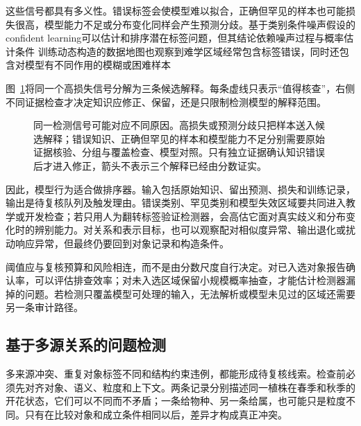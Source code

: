 \Needspace{95mm}
这些信号都具有多义性。错误标签会使模型难以拟合，正确但罕见的样本也可能损失很高，模型能力不足或分布变化同样会产生预测分歧。基于类别条件噪声假设的confident learning可以估计和排序潜在标签问题，但其结论依赖噪声过程与概率估计条件 训练动态构造的数据地图也观察到难学区域经常包含标签错误，同时还包含对模型有不同作用的模糊或困难样本

图~\ref{fig:knowledge-quality-assessment-correction-detection-signal}将同一个高损失信号分解为三条候选解释。每条虚线只表示“值得核查”，右侧不同证据检查才决定知识应修正、保留，还是只限制检测模型的解释范围。

\begin{figure}[p]
  \centering
  
  \caption{同一检测信号可能对应不同原因。高损失或预测分歧只把样本送入候选解释；错误知识、正确但罕见的样本和模型能力不足分别需要原始证据核验、分组与覆盖检查、模型对照。只有独立证据确认知识错误后才进入修正，箭头不表示三个解释已经由分数证实。}
  \label{fig:knowledge-quality-assessment-correction-detection-signal}
\end{figure}
\FloatBarrier

因此，模型行为适合做排序器。输入包括原始知识、留出预测、损失和训练记录，输出是待复核队列及触发理由。错误类别、罕见类别和模型失效区域要共同进入教学或开发检查；若只用人为翻转标签验证检测器，会高估它面对真实歧义和分布变化时的辨别能力。对关系和表示目标，也可以观察配对相似度异常、输出退化或扰动响应异常，但最终仍要回到对象记录和构造条件。

阈值应与复核预算和风险相连，而不是由分数尺度自行决定。对已入选对象报告确认率，可以评估排查效率；对未入选区域保留小规模概率抽查，才能估计检测器漏掉的问题。若检测只覆盖模型可处理的输入，无法解析或模型未见过的区域还需要另一条审计路径。

\subsection{基于多源关系的问题检测}
\label{sec:knowledge-quality-assessment-correction-multisource-detection}

多来源冲突、重复对象标签不同和结构约束违例，都能形成待复核线索。检查前必须先对齐对象、语义、粒度和上下文。两条记录分别描述同一植株在春季和秋季的开花状态，它们可以不同而不矛盾；一条给物种、另一条给属，也可能只是粒度不同。只有在比较对象和成立条件相同以后，差异才构成真正冲突。

